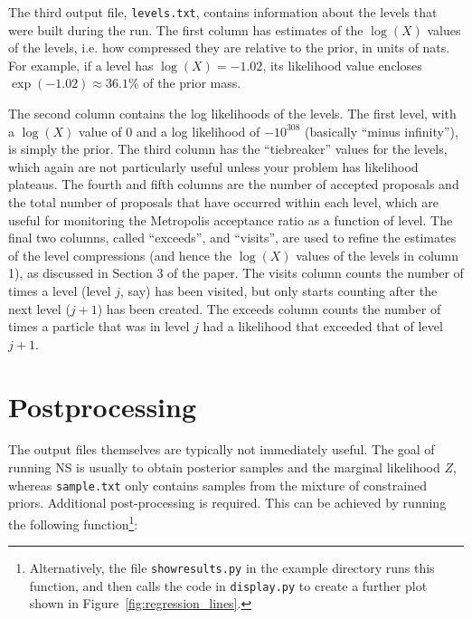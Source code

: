 \documentclass[article]{jss}
\begin{document}
The third output file, {\tt levels.txt}, contains information about the levels
that were built during the run. The first column has estimates of the $\log(X)$
values of the levels, i.e. how compressed they are relative to the prior, in
units of nats. For example, if a level has $\log(X) = -1.02$, its likelihood
value encloses $\exp(-1.02) \approx 36.1\%$ of the prior mass.

The second column contains the log likelihoods of the levels.
The first level, with a $\log(X)$ value of 0 and a log likelihood of
$-10^{308}$ (basically ``minus infinity''), is simply the prior. The third
column has the ``tiebreaker'' values for the levels, which again are not
particularly useful unless your problem has likelihood plateaus. The fourth
and fifth columns are the number of accepted proposals and the total number
of proposals that have occurred within each level, which are useful for
monitoring the Metropolis acceptance ratio as a function of level.
The final two columns, called ``exceeds'', and ``visits'', are used to refine
the estimates of the level compressions (and hence the $\log(X)$ values of
the levels in column 1), as discussed in Section 3 of the
paper. The visits column counts the number of times a level (level $j$, say)
has been visited, but only starts counting after the next level ($j+1$) has been created. The exceeds column counts the number of times a particle that was
in level $j$ had a likelihood that exceeded that of level $j+1$.

\section{Postprocessing}\label{sec:postprocessing}
The output files themselves are typically not immediately useful.
The goal of running
NS is usually to obtain posterior samples and the marginal likelihood $Z$,
whereas {\tt sample.txt} only contains samples from the mixture of constrained
priors. Additional
post-processing is required. This can be achieved by running the following
 function\footnote{Alternatively, the file
{\tt showresults.py} in the example directory runs this function, and then
calls the code in {\tt display.py} to create a further plot shown in
Figure~\ref{fig:regression_lines}.}:
\end{document}
